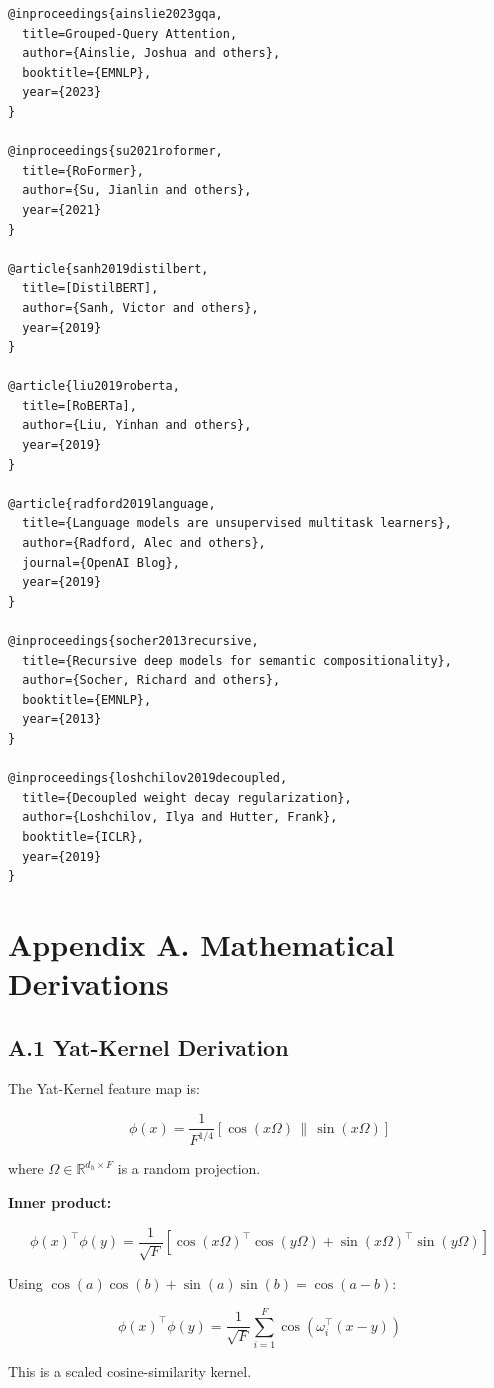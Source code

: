 \begin{lstlisting}
@inproceedings{ainslie2023gqa,
  title=Grouped-Query Attention,
  author={Ainslie, Joshua and others},
  booktitle={EMNLP},
  year={2023}
}

@inproceedings{su2021roformer,
  title={RoFormer},
  author={Su, Jianlin and others},
  year={2021}
}

@article{sanh2019distilbert,
  title=[DistilBERT],
  author={Sanh, Victor and others},
  year={2019}
}

@article{liu2019roberta,
  title=[RoBERTa],
  author={Liu, Yinhan and others},
  year={2019}
}

@article{radford2019language,
  title={Language models are unsupervised multitask learners},
  author={Radford, Alec and others},
  journal={OpenAI Blog},
  year={2019}
}

@inproceedings{socher2013recursive,
  title={Recursive deep models for semantic compositionality},
  author={Socher, Richard and others},
  booktitle={EMNLP},
  year={2013}
}

@inproceedings{loshchilov2019decoupled,
  title={Decoupled weight decay regularization},
  author={Loshchilov, Ilya and Hutter, Frank},
  booktitle={ICLR},
  year={2019}
}
\end{lstlisting}



\section{Appendix A. Mathematical Derivations}

\subsection{A.1 Yat-Kernel Derivation}

The Yat-Kernel feature map is:

\[
\phi(x) = \frac{1}{F^{1/4}} [\cos(x \Omega) \,\|\, \sin(x \Omega)]
\]

where $\Omega \in \mathbb{R}^{d_h \times F}$ is a random projection.

\textbf{Inner product:}

\[
\phi(x)^\top \phi(y) = \frac{1}{\sqrt{F}} [\cos(x\Omega)^\top \cos(y\Omega) 
+ \sin(x\Omega)^\top \sin(y\Omega)]
\]

Using $\cos(a)\cos(b) + \sin(a)\sin(b) = \cos(a - b)$:

\[
\phi(x)^\top \phi(y) = \frac{1}{\sqrt{F}} \sum_{i=1}^{F} \cos(\omega_i^\top (x - y))
\]

This is a scaled cosine-similarity kernel.

